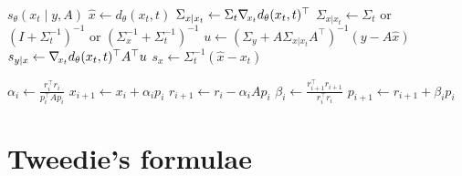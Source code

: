 \begin{subappendices}
\begin{algorithm}
    \caption{Moment matching posterior score} \label{alg:mmps}
    \begin{algorithmic}[1]
        \Function{}{} $s_{\theta}(x_t \mid y, A)$ 
            \State $\hat{x} \gets d_\theta(x_t, t)$
                \State $\Sigma_{x|x_t} \gets \Sigma_t \nabla_{\!{x_t}} d_\theta(x_t, t)^\top$
            \Else
                \State $\Sigma_{x|x_t} \gets \Sigma_t$ or $(I + \Sigma_t^{-1})^{-1}$ or $(\Sigma_x^{-1} + \Sigma_t^{-1})^{-1}$
            \EndIf
            \State $u \gets \left( \Sigma_y + A \Sigma_{x|x_t} A^\top \right)^{-1} (y - A \hat{x})$ 
            \State $s_{y|x} \gets \nabla_{\!{x_t}} d_\theta(x_t, t) ^\top A^\top u$ 
            \State $s_x \gets \Sigma_t^{-1}(\hat{x} - x_t)$ 
            \State {}
        \EndFunction
	\end{algorithmic}
\end{algorithm}

\begin{algorithm}
    \caption{Conjugate gradient method} \label{alg:cg}
    \begin{algorithmic}[1]
                    \State {}
                \EndIf
                \State $\displaystyle \alpha_i \gets \frac{r_i^\top r_i}{p_i^\top A p_i}$
                \State $x_{i+1} \gets x_i + \alpha_i p_i$
                \State $r_{i+1} \gets r_i - \alpha_i A p_i$
                \State $\displaystyle \beta_i \gets \frac{r_{i+1}^\top r_{i+1}}{r_i^\top r_i}$
                \State $p_{i+1} \gets r_{i+1} + \beta_i p_i$
            \EndFor
            \State {}
        \EndFunction
	\end{algorithmic}
\end{algorithm}

\clearpage

\section{Tweedie's formulae} \label{app:diem-tweedie}


\end{subappendices}
